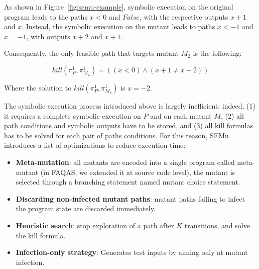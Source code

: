 As shown in Figure~\ref{fig:semu-example}, symbolic execution on the original program leads to the paths $x < 0$ and $False$, with the respective outputs $x + 1$ and $x$.
Instead, the symbolic execution on the mutant leads to paths $x < -1$ and $x = -1$, with outputs $x + 2$ and $x + 1$.

Consequently, the only feasible path that targets mutant $M_2$ is the following:

\begin{equation}
	kill(\pi_{P}^{1}, \pi_{M_2}^{1}) = ((x < 0) \wedge (x + 1 \neq x + 2) )
\end{equation}

Where the solution to $kill(\pi_{P}^{1}, \pi_{M_2}^{1})$ is $x = -2$.

The symbolic execution process introduced above is largely inefficient; indeed,
(1) it requires a complete symbolic execution on $P$ and on each mutant $M$, (2) all path conditions and symbolic outputs have to be stored, and (3) all kill formulas has to be solved for each pair of paths conditions. 
For this reason, SEMu introduces a list of optimizations to reduce execution time:

\begin{itemize}
	\item \textbf{Meta-mutation}: all mutants are encoded into a single program called meta-mutant (in FAQAS, we extended it at source code level), the mutant is selected through a branching statement named mutant choice statement.
	\item \textbf{Discarding non-infected mutant paths}: mutant paths failing to infect the program state are discarded immediately.
	\item \textbf{Heuristic search}: stop exploration of a path after $K$ transitions, and solve the kill formula.
	\item \textbf{Infection-only strategy}: Generates test inputs by aiming only at mutant infection.
\end{itemize}


